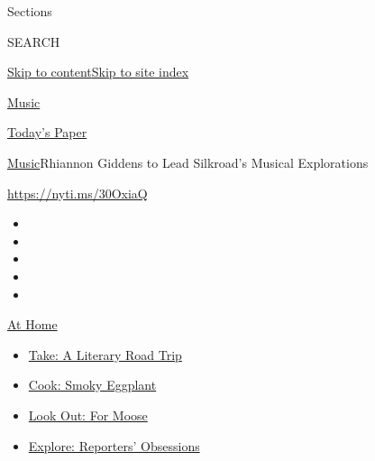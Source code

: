 Sections

SEARCH

\protect\hyperlink{site-content}{Skip to
content}\protect\hyperlink{site-index}{Skip to site index}

\href{https://www.nytimes3xbfgragh.onion/section/arts/music}{Music}

\href{https://myaccount.nytimes3xbfgragh.onion/auth/login?response_type=cookie\&client_id=vi}{}

\href{https://www.nytimes3xbfgragh.onion/section/todayspaper}{Today's
Paper}

\href{/section/arts/music}{Music}\textbar{}Rhiannon Giddens to Lead
Silkroad's Musical Explorations

\url{https://nyti.ms/30OxiaQ}

\begin{itemize}
\item
\item
\item
\item
\item
\end{itemize}

\href{https://www.nytimes3xbfgragh.onion/spotlight/at-home?action=click\&pgtype=Article\&state=default\&region=TOP_BANNER\&context=at_home_menu}{At
Home}

\begin{itemize}
\tightlist
\item
  \href{https://www.nytimes3xbfgragh.onion/2020/07/28/books/time-for-a-literary-road-trip.html?action=click\&pgtype=Article\&state=default\&region=TOP_BANNER\&context=at_home_menu}{Take:
  A Literary Road Trip}
\item
  \href{https://www.nytimes3xbfgragh.onion/2020/07/29/magazine/bored-with-your-home-cooking-some-smoky-eggplant-will-fix-that.html?action=click\&pgtype=Article\&state=default\&region=TOP_BANNER\&context=at_home_menu}{Cook:
  Smoky Eggplant}
\item
  \href{https://www.nytimes3xbfgragh.onion/2020/07/27/travel/moose-michigan-isle-royale.html?action=click\&pgtype=Article\&state=default\&region=TOP_BANNER\&context=at_home_menu}{Look
  Out: For Moose}
\item
  \href{https://www.nytimes3xbfgragh.onion/interactive/2020/at-home/even-more-reporters-editors-diaries-lists-recommendations.html?action=click\&pgtype=Article\&state=default\&region=TOP_BANNER\&context=at_home_menu}{Explore:
  Reporters' Obsessions}
\end{itemize}

